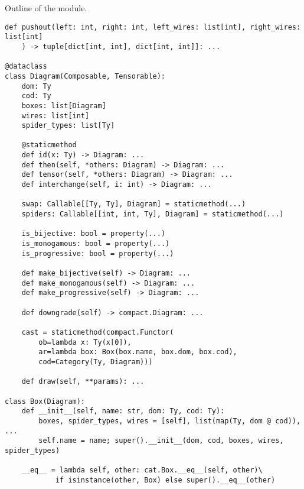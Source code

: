 \begin{python}\label{listing:discopy-hypergraph}
{\normalfont Outline of the  module.}

\begin{verbatim}
def pushout(left: int, right: int, left_wires: list[int], right_wires: list[int]
    ) -> tuple[dict[int, int], dict[int, int]]: ...

@dataclass
class Diagram(Composable, Tensorable):
    dom: Ty
    cod: Ty
    boxes: list[Diagram]
    wires: list[int]
    spider_types: list[Ty]

    @staticmethod
    def id(x: Ty) -> Diagram: ...
    def then(self, *others: Diagram) -> Diagram: ...
    def tensor(self, *others: Diagram) -> Diagram: ...
    def interchange(self, i: int) -> Diagram: ...

    swap: Callable[[Ty, Ty], Diagram] = staticmethod(...)
    spiders: Callable[[int, int, Ty], Diagram] = staticmethod(...)

    is_bijective: bool = property(...)
    is_monogamous: bool = property(...)
    is_progressive: bool = property(...)

    def make_bijective(self) -> Diagram: ...
    def make_monogamous(self) -> Diagram: ...
    def make_progressive(self) -> Diagram: ...

    def downgrade(self) -> compact.Diagram: ...

    cast = staticmethod(compact.Functor(
        ob=lambda x: Ty(x[0]),
        ar=lambda box: Box(box.name, box.dom, box.cod),
        cod=Category(Ty, Diagram)))

    def draw(self, **params): ...

class Box(Diagram):
    def __init__(self, name: str, dom: Ty, cod: Ty):
        boxes, spider_types, wires = [self], list(map(Ty, dom @ cod)), ...
        self.name = name; super().__init__(dom, cod, boxes, wires, spider_types)

    __eq__ = lambda self, other: cat.Box.__eq__(self, other)\
            if isinstance(other, Box) else super().__eq__(other)
\end{verbatim}
\end{python}


